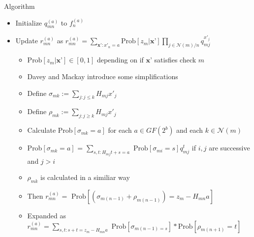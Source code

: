 \documentclass[10pt,ignorenonframetext,]{beamer}
\providecommand{\tightlist}{%
  \setlength{\itemsep}{0pt}\setlength{\parskip}{0pt}}
\begin{document}
\begin{frame}{Algorithm}
\protect\hypertarget{algorithm}{}
\begin{itemize}[<+->]
\tightlist
\item
  Initialize \(q_{mn}^{(a)}\) to \(f^{(a)}_n\)
\item
  Update \(r_{mn}^{(a)}\) as
  \(r_{mn}^{(a)} = \sum\limits_{\textbf{x'}:x'_n=a}\text{Prob}[z_m|\textbf{x'}]\prod\limits_{j\in\mathcal{N}(m)/n}q^{x'_j}_{mj}\)

  \begin{itemize}[<+->]
  \tightlist
  \item
    \(\text{Prob}[z_m|\textbf{x'}]\in [0,1]\) depending on if
    \(\textbf{x'}\) satisfies check \(m\)
  \item
    Davey and Mackay introduce some simplifications
  \item
    Define \(\sigma_{mk} := \sum_{j:j\le k} H_{mj}x'_j\)
  \item
    Define \(\rho_{mk} := \sum_{j:j\ge k} H_{mj}x'_j\)
  \item
    Calculate Prob\([\sigma_{mk}=a]\) for each \(a\in GF(2^b)\) and each
    \(k\in \mathcal{N}(m)\)
  \item
    Prob\([\sigma_{mk}=a]\) =
    \(\sum\limits_{s,t:H_{mj}t+s=a}\text{ Prob}[\sigma_{mi}=s]q^t_{mj}\)
    if \(i,j\) are successive and \(j>i\)
  \item
    \(\rho_{mk}\) is calculated in a similiar way
  \item
    Then
    \(r^{(a)}_{mn} = \text{ Prob}[(\sigma_{m(n-1)}+\rho_{m(n-1)})=z_m-H_{mn}a]\)
  \item
    Expanded as
    \(r^{(a)}_{mn} = \sum\limits_{s,t:s+t=z_m-H_{mn}a}\text{ Prob}[\sigma_{m(n-1)=s}] * \text{Prob}[\rho_{m(n+1)}=t]\)
  \end{itemize}
\end{itemize}
\end{frame}
\end{document}
